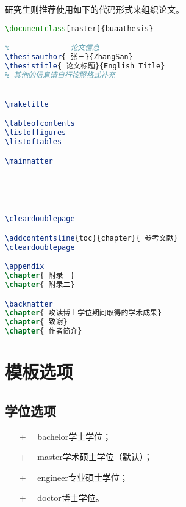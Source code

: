 \qquad 研究生则推荐使用如下的代码形式来组织论文。\par
\begin{lstlisting}[language={LaTeX}]
\documentclass[master]{buaathesis}

%------        论文信息            -------
\thesisauthor{ 张三}{ZhangSan}
\thesistitle{ 论文标题}{English Title}
% 其他的信息请自行按照格式补充


\maketitle

\tableofcontents
\listoffigures
\listoftables

\mainmatter
	

	


\cleardoublepage

\addcontentsline{toc}{chapter}{ 参考文献}
\cleardoublepage

\appendix
\chapter{ 附录一}
\chapter{ 附录二}

\backmatter
\chapter{ 攻读博士学位期间取得的学术成果}
\chapter{ 致谢}
\chapter{ 作者简介}


\end{lstlisting}
	
	\section{模板选项}
		\subsection{学位选项}
		\begin{itemize}
			\item[+] ~~bachelor\quad 学士学位；\\
			\item[+] ~~master\quad 学术硕士学位（默认）；\\
			\item[+] ~~engineer\quad 专业硕士学位；\\
			\item[+] ~~doctor\quad 博士学位。\\
		\end{itemize}
